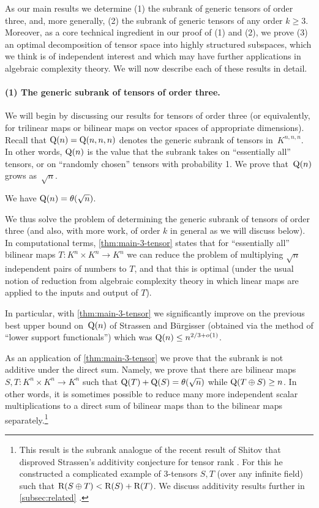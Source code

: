 \documentclass[11pt]{article}
\theoremstyle{definition}
\theoremstyle{remark}
\newcommand{\trk}{{\rm R}}
\newcommand{\subrank}{{\rm Q}}
\newcommand{\gensubrank}{{\rm Q}}
\begin{document}
As our main results we determine (1) the subrank of generic tensors of order three, %
and, more generally, (2) the subrank of generic tensors of any order $k \geq 3$. %
Moreover, as a core technical ingredient in our proof of (1) and (2), we prove (3) an optimal decomposition of tensor space into highly structured subspaces, which we think is of independent interest and which may have further applications in algebraic complexity theory. We will now describe each of these results in detail.

\paragraph{(1) The generic subrank of tensors of order three.}
We will begin by discussing our results for tensors of order three (or equivalently, for trilinear maps %
or bilinear maps on vector spaces of appropriate dimensions). %
Recall that $\gensubrank(n) = \gensubrank(n,n,n)$ denotes the generic subrank of tensors in~$K^{n,n,n}$. In other words, $\gensubrank(n)$ is the value that the subrank takes on ``essentially all'' tensors, or on ``randomly chosen'' tensors with probability 1. We prove that~$\gensubrank(n)$ grows as~$\sqrt{n}$.

\begin{theorem}\label{thm:main-3-tensor}
We have $\gensubrank(n) = \theta(\sqrt{n})$.
\end{theorem}

We thus solve the problem of determining the generic subrank of tensors of order three (and also, with more work, of order $k$ in general as we will discuss below).
In computational terms, \autoref{thm:main-3-tensor} states that for ``essentially all'' bilinear maps $T : K^n \times K^n \to K^n$ we can reduce the problem of multiplying $\sqrt{n}$ independent pairs of numbers  to $T$, and that this is optimal (under the usual notion of reduction from algebraic complexity theory in which linear maps are applied to the inputs and output of $T$). 

In particular, with \autoref{thm:main-3-tensor} we significantly improve on the previous best upper bound on~$\gensubrank(n)$ of Strassen and Bürgisser (obtained via the method of ``lower support functionals'') which was $\gensubrank(n) \leq n^{2/3 + o(1)}$.

As an application of \autoref{thm:main-3-tensor} we prove that the subrank is not additive under the direct sum. Namely, we prove that there are bilinear maps $S,T : K^n \times K^n \to K^n$ such that $\subrank(T) + \subrank(S) = \theta(\sqrt{n})$ while $\subrank(T \oplus S) \geq n$. In other words, it is sometimes possible to reduce many more independent scalar multiplications to a direct sum of bilinear maps than to the bilinear maps separately.\footnote{This result is the subrank analogue of the recent result of Shitov \cite{MR3974478} that disproved Strassen's additivity conjecture for tensor rank \cite{MR521168}. For this he constructed a complicated example of 3-tensors $S,T$ (over any infinite field) such that $\trk(S \oplus T) < \trk(S) + \trk(T)$. We discuss additivity results further in \autoref{subsec:related}
.}
%
\end{document}
